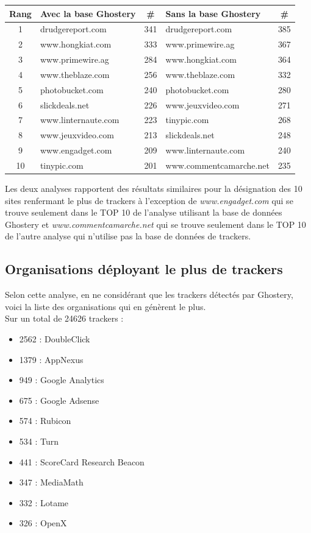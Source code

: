 \begin{tabular}{ c | p{5cm} | c || p{5cm} | c | }
   Rang & Avec la base Ghostery & \# & Sans la base Ghostery & \# \\
   \hline
   1 & drudgereport.com & 341 & drudgereport.com & 385\\
   2 & www.hongkiat.com & 333 & www.primewire.ag & 367\\
   3 & www.primewire.ag & 284 & www.hongkiat.com & 364\\
   4 & www.theblaze.com & 256 & www.theblaze.com & 332\\
   5 & photobucket.com & 240 & photobucket.com & 280\\
   6 & slickdeals.net & 226 & www.jeuxvideo.com & 271\\
   7 & www.linternaute.com & 223 & tinypic.com & 268\\
   8 & www.jeuxvideo.com & 213 & slickdeals.net & 248\\
   9 & www.engadget.com & 209 & www.linternaute.com & 240\\
   10 & tinypic.com & 201 & www.commentcamarche.net & 235\\
   \hline
\end{tabular}
\newline

Les deux analyses rapportent des résultats similaires pour la désignation des 10 sites renfermant le plus de trackers à l'exception de \textit{www.engadget.com} qui se trouve seulement dans le TOP 10 de l'analyse utilisant la base de données Ghostery et \textit{www.commentcamarche.net} qui se trouve seulement dans le TOP 10 de l'autre analyse qui n'utilise pas la base de données de trackers.

\subsection{Organisations déployant le plus de trackers}
Selon cette analyse, en ne considérant que les trackers détectés par Ghostery, voici la liste des organisations qui en génèrent le plus.\\
Sur un total de 24626 trackers :
\begin{multicols}{2}
\begin{itemize}
  \item 2562 : DoubleClick
  \item 1379 : AppNexus
  \item 949 : Google Analytics
  \item 675 : Google Adsense
  \item 574 : Rubicon
  \item 534 : Turn
  \item 441 : ScoreCard Research Beacon
  \item 347 : MediaMath
  \item 332 : Lotame
  \item 326 : OpenX
\end{itemize}
\end{multicols}

